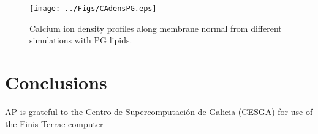 \documentclass[aps,prl,superscriptaddress,twocolumn]{revtex4}
\begin{document}



\begin{figure}[]
  \centering
  \texttt{[image: ../Figs/CAdensPG.eps]}
  \caption{\label{CAdensPG}
    Calcium ion density profiles along membrane normal
    from different simulations with PG lipids.
  }
\end{figure}




\clearpage
\section{Conclusions}


%

\begin{acknowledgments}
AP is grateful to the Centro de
Supercomputación de Galicia (CESGA) for use of the Finis
Terrae computer
\end{acknowledgments}



\end{document}
